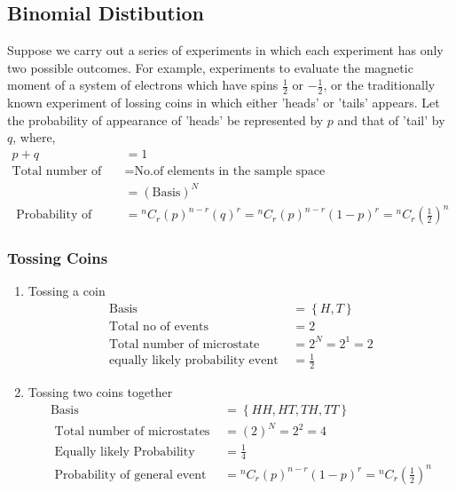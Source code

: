 \subsection{ Binomial Distibution}
Suppose we carry out a series of experiments in which each experiment has only two possible outcomes. For example, experiments to evaluate the magnetic moment of a system of electrons which have spins $\frac{1}{2}$ or $-\frac{1}{2}$, or the traditionally known experiment of lossing coins in which either 'heads' or 'tails' appears. Let the probability of appearance of 'heads' be represented by $p$ and that of 'tail' by $q$, where,
\begin{align*}
p+q&=1\\
\text{Total number of microstate }&=\text{No.of elements in the sample space}\\&=\left(\text{Basis} \right)^N\\
\text { Probability of general event } 
&={ }^{n} C_{r}(p)^{n-r}(q)^{r} ={ }^{n} C_{r}(p)^{n-r}(1-p)^{r}=
{ }^{n} C_{r}\left(\frac{1}{2}\right)^{n}
\end{align*}
\subsubsection{ Tossing Coins}
\begin{enumerate}
	\item Tossing a coin
	\begin{align*}
	\text{Basis }&=\left\lbrace H,T\right\rbrace \\
	\text{Total no of events }&=2\\
	\text{Total number of microstate }&=2^N=2^1=2 \\
	\text{equally likely probability event }&=\frac{1}{2} 
	\end{align*}
	\item {Tossing two coins together}
	\begin{align*}
	\text{Basis }&=\left\lbrace H H, H T, T H, T T\right\rbrace \\
	\text{ Total number of microstates }&=(2)^{N}=2^2=4\\
	\text{ Equally likely Probability }&=\frac{1}{4} \\
	\text { Probability of general event } 
	&={ }^{n} C_{r}(p)^{n-r}(1-p)^{r} =
	{ }^{n} C_{r}\left(\frac{1}{2}\right)^{n}
	\end{align*}
\end{enumerate}
